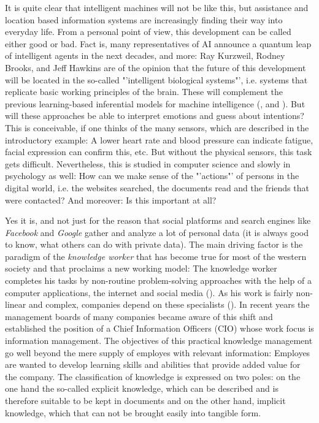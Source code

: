 It is quite clear that intelligent machines will not be like this, but assistance and location based information systems are increasingly finding their way into everyday life. From a personal point of view, this development can be called either good or bad. Fact is, many representatives of \ac{AI} announce a quantum leap of  intelligent agents in the next decades, and more: Ray Kurzweil, Rodney Brooks, and Jeff Hawkins are of the opinion that the future of this development will be located in the so-called "'intelligent biological systems"', i.e. systems that replicate basic working principles of the brain. These will complement the previous learning-based inferential models for machine intelligence (\cite{kurzweil2013create},\cite{hawkins2007intelligence} and \cite{brooks2012brain}). 
But will these approaches be able to interpret emotions and guess about intentions? This is conceivable, if one thinks of the many sensors, which are described in the introductory example: A lower heart rate and blood pressure can indicate fatigue, facial expression can confirm this, etc. But without the physical sensors, this task gets difficult. Nevertheless, this is studied in computer science and slowly in psychology as well: How can we make sense of the "'actions"' of persons in the digital world, i.e. the websites searched, the documents read and the friends that were contacted? And moreover: Is this important at all?

Yes it is, and not just for the reason that social platforms and search engines like \textit{Facebook} and \textit{Google} gather and analyze a lot of personal data (it is always good to know, what others can do with private data). The main driving factor is the paradigm of the \textit{knowledge worker} that has become true for most of the western society and that proclaims a new working model:  The knowledge worker completes his tasks by non-routine problem-solving approaches with the help of a computer applications, the internet and social media (\cite{drucker1999knowledge}). As his work is fairly non-linear and complex, companies depend on these specialists (\cite{foss2006strategy}). In recent years the management boards of many companies became aware of this shift and established the position of a Chief Information Officers (CIO) whose work focus is information management. The objectives of this practical knowledge management go well beyond the mere supply of employes with relevant information: Employes are wanted to develop learning skills and abilities that provide added value for the company. The classification of knowledge is expressed on two poles: on the one hand the so-called explicit knowledge, which can be described and is therefore suitable to be kept in documents and on the other hand, implicit knowledge, which that can not be brought easily into tangible form. 

